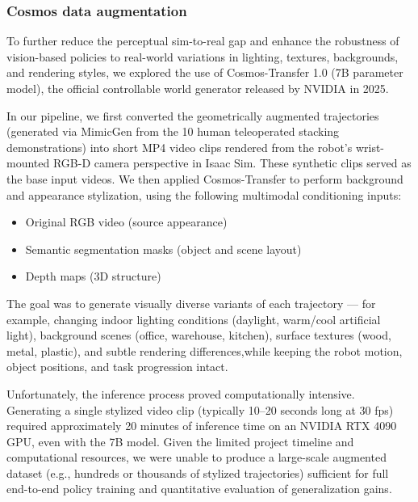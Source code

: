 \documentclass{article} %
\begin{document}
\subsubsection{Cosmos data augmentation}  
To further reduce the perceptual sim-to-real gap and enhance the robustness of vision-based policies to real-world variations in lighting, textures, backgrounds, and rendering styles, we explored the use of Cosmos-Transfer 1.0 (7B parameter model), the official controllable world generator released by NVIDIA in 2025.

In our pipeline, we first converted the geometrically augmented trajectories (generated via MimicGen from the 10 human teleoperated stacking demonstrations) into short MP4 video clips rendered from the robot’s wrist-mounted RGB-D camera perspective in Isaac Sim. These synthetic clips served as the base input videos. We then applied Cosmos-Transfer to perform background and appearance stylization, using the following multimodal conditioning inputs:

\begin{minipage}{\linewidth}
\begin{itemize}
\item Original RGB video (source appearance)
\item Semantic segmentation masks (object and scene layout)
\item Depth maps (3D structure)
\end{itemize}
\end{minipage}

The goal was to generate visually diverse variants of each trajectory — for example, changing indoor lighting conditions (daylight, warm/cool artificial light), background scenes (office, warehouse, kitchen), surface textures (wood, metal, plastic), and subtle rendering differences,while keeping the robot motion, object positions, and task progression intact.

Unfortunately, the inference process proved computationally intensive. Generating a single stylized video clip (typically 10–20 seconds long at 30 fps) required approximately 20 minutes of inference time on an NVIDIA RTX 4090 GPU, even with the 7B model. Given the limited project timeline and computational resources, we were unable to produce a large-scale augmented dataset (e.g., hundreds or thousands of stylized trajectories) sufficient for full end-to-end policy training and quantitative evaluation of generalization gains.
\end{document}
